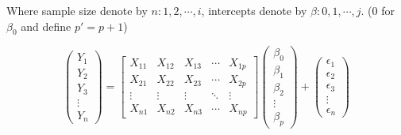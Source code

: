 \documentclass[12pt]{article}
\begin{document}
Where sample size denote by $n: 1, 2, \cdots, i$, intercepts denote by $\beta: 0, 1, \cdots, j$. (0 for $\beta_0$ and define 
$p' = p + 1$)

\[
\begin{pmatrix}
Y_1 \\
Y_2 \\
Y_3 \\
\vdots \\
Y_n
\end{pmatrix}
=
\begin{bmatrix}
X_{11} & X_{12} & X_{13} & \cdots & X_{1p} \\
X_{21} & X_{22} & X_{23} & \cdots & X_{2p} \\
\vdots & \vdots & \vdots & \ddots & \vdots \\
X_{n1} & X_{n2} & X_{n3} & \cdots & X_{np}
\end{bmatrix}
\begin{pmatrix}
\beta_0 \\
\beta_1 \\
\beta_2 \\
\vdots  \\
\beta_p
\end{pmatrix}
+
\begin{pmatrix}
\epsilon_1 \\
\epsilon_2 \\
\epsilon_3 \\
\vdots  \\
\epsilon_n
\end{pmatrix}
\]
\end{document}
